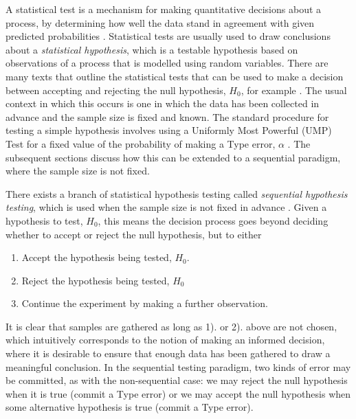 

A statistical test is a mechanism for making quantitative decisions about a process, by determining how well the data stand in agreement with given predicted probabilities \cite{cowan1998statistical}. Statistical tests are usually used to draw conclusions about a \textit{statistical hypothesis}, which is a testable hypothesis based on observations of a process that is modelled using random variables. There are many texts that outline the statistical tests that can be used to make a decision between accepting and rejecting the null hypothesis, $H_0$, for example \cite{IntroductionToMathematicalStatistics}. The usual context in which this occurs is one in which the data has been collected in advance and the sample size is fixed and known. The standard procedure for testing a simple hypothesis involves using a Uniformly Most Powerful (UMP) Test for a fixed value of the probability of making a Type  error, $\alpha$ \cite[p.~253]{IntroductionToMathematicalStatistics}. The subsequent sections discuss how this can be extended to a sequential paradigm, where the sample size is not fixed. \par

There exists a branch of statistical hypothesis testing called \textit{sequential hypothesis testing}, which is used when the sample size is not fixed in advance \cite[p.~375]{IntroductionToMathematicalStatistics}. Given a hypothesis to test, $H_0$, this means the decision process goes beyond deciding whether to accept or reject the null hypothesis, but to either
\begin{enumerate}
    \item Accept the hypothesis being tested, $H_0$.
    \item Reject the hypothesis being tested, $H_0$
    \item Continue the experiment by making a further observation.
\end{enumerate}

It is clear that samples are gathered as long as 1). or 2). above are not chosen, which intuitively corresponds to the notion of making an informed decision, where it is desirable to ensure that enough data has been gathered to draw a meaningful conclusion. In the sequential testing paradigm, two kinds of error may be committed, as with the non-sequential case: we may reject the null hypothesis when it is true (commit a Type  error) or we may accept the null hypothesis when some alternative hypothesis is true (commit a Type  error). 

